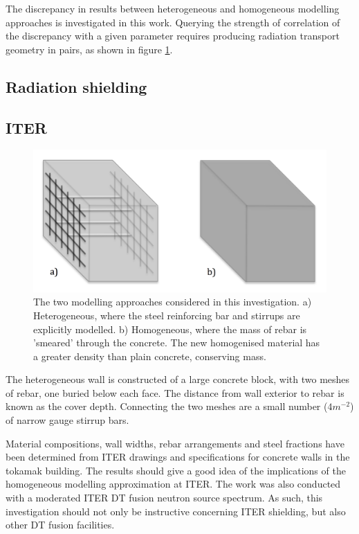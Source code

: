 The discrepancy in results between heterogeneous and homogeneous modelling approaches is investigated in this work. Querying the strength of correlation of the discrepancy with a given parameter requires producing radiation transport geometry in pairs, as shown in figure \ref{fig:wall_diagram}. 

\subsection{Radiation shielding}
% 

\subsection{ITER}

\begin{figure}[H]
	\includegraphics[width=\textwidth]{wall_diagram}
	\caption{The two modelling approaches considered in this investigation. a) Heterogeneous, where the steel reinforcing bar and stirrups are explicitly modelled. b) Homogeneous, where the mass of rebar is 'smeared' through the concrete. The new homogenised material has a greater density than plain concrete, conserving mass.}
	\label{fig:wall_diagram}
\end{figure}

The heterogeneous wall is constructed of a large concrete block, with two meshes of rebar, one buried below each face. The distance from wall exterior to rebar is known as the cover depth. Connecting the two meshes are a small number ($4m^{-2}$) of narrow gauge stirrup bars.

Material compositions, wall widths, rebar arrangements and steel fractions have been determined from ITER drawings and specifications for concrete walls in the tokamak building. The results should give a good idea of the implications of the homogeneous modelling approximation at ITER. The work was also conducted with a moderated ITER DT fusion neutron source spectrum. As such, this investigation should not only be instructive concerning ITER shielding, but also other DT fusion facilities.

